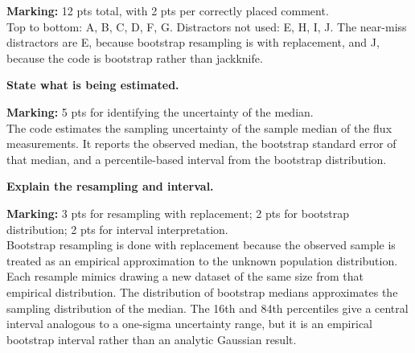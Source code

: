 \documentclass{article}
\newcommand{\givesolutions}{true}
\newcommand{\answer}[2]{%
\ifthenelse{\equal{#2}{true}}%
{{\color{blue}#1}}%
{}%
}
\newenvironment{ansbox}[1]{%
  \begin{lrbox}{\mybox}\begin{minipage}[t][#1]{\linewidth}%
}{%
  \vfill\hfill\end{minipage}\end{lrbox}\fbox{\usebox{\mybox}}%
}
\begin{document}
\begin{ansbox}{1.2in}
    \answer{\textbf{Marking:} 12 pts total, with 2 pts per correctly placed comment.\\Top to bottom: A, B, C, D, F, G. Distractors not used: E, H, I, J. The near-miss distractors are E, because bootstrap resampling is with replacement, and J, because the code is bootstrap rather than jackknife.}{\givesolutions}
\end{ansbox}

\textbf{State what is being estimated.}

\begin{ansbox}{1.2in}
    \answer{\textbf{Marking:} 5 pts for identifying the uncertainty of the median.\\The code estimates the sampling uncertainty of the sample median of the flux measurements. It reports the observed median, the bootstrap standard error of that median, and a percentile-based interval from the bootstrap distribution.}{\givesolutions}
\end{ansbox}

\textbf{Explain the resampling and interval.}

\begin{ansbox}{2.2in}
    \answer{\textbf{Marking:} 3 pts for resampling with replacement; 2 pts for bootstrap distribution; 2 pts for interval interpretation.\\Bootstrap resampling is done with replacement because the observed sample is treated as an empirical approximation to the unknown population distribution. Each resample mimics drawing a new dataset of the same size from that empirical distribution. The distribution of bootstrap medians approximates the sampling distribution of the median. The 16th and 84th percentiles give a central interval analogous to a one-sigma uncertainty range, but it is an empirical bootstrap interval rather than an analytic Gaussian result.}{\givesolutions}
\end{ansbox}
\end{document}
